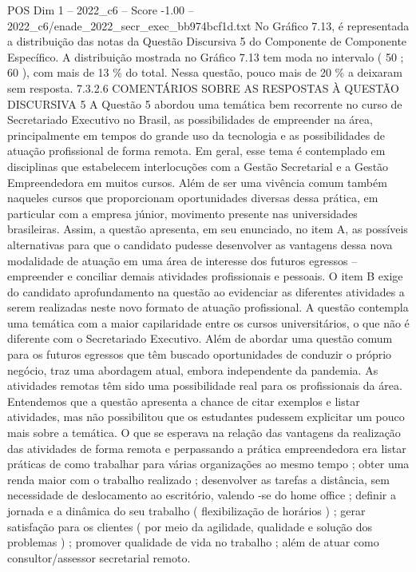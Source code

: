 \begin{textsample}{POS Dim 1 – 2022\_c6 – Score -1.00 – 2022\_c6/enade\_2022\_secr\_exec\_bb974bcf1d.txt}
No Gráfico 7.13, é representada a distribuição das notas da Questão Discursiva 5 do Componente de Componente Específico.
A distribuição mostrada no Gráfico 7.13 tem moda no intervalo ( 50 ; 60 ), com mais de 13 \% do total.
Nessa questão, pouco mais de 20 \% a deixaram sem resposta. 7.3.2.6 COMENTÁRIOS SOBRE AS RESPOSTAS À QUESTÃO DISCURSIVA 5 A Questão 5 abordou uma temática bem recorrente no curso de Secretariado Executivo no Brasil, as possibilidades de empreender na área, principalmente em tempos do grande uso da tecnologia e as possibilidades de atuação profissional de forma remota.
Em geral, esse tema é contemplado em disciplinas que estabelecem interlocuções com a Gestão Secretarial e a Gestão Empreendedora em muitos cursos.
Além de ser uma vivência comum também naqueles cursos que proporcionam oportunidades diversas dessa prática, em particular com a empresa júnior, movimento presente nas universidades brasileiras.
Assim, a questão apresenta, em seu enunciado, no item A, as possíveis alternativas para que o candidato pudesse desenvolver as vantagens dessa nova modalidade de atuação em uma área de interesse dos futuros egressos – empreender e conciliar demais atividades profissionais e pessoais.
O item B exige do candidato aprofundamento na questão ao evidenciar as diferentes atividades a serem realizadas neste novo formato de atuação profissional.
A questão contempla uma temática com a maior capilaridade entre os cursos universitários, o que não é diferente com o Secretariado Executivo.
Além de abordar uma questão comum para os futuros egressos que têm buscado oportunidades de conduzir o próprio negócio, traz uma abordagem atual, embora independente da pandemia.
As atividades remotas têm sido uma possibilidade real para os profissionais da área.
Entendemos que a questão apresenta a chance de citar exemplos e listar atividades, mas não possibilitou que os estudantes pudessem explicitar um pouco mais sobre a temática.
O que se esperava na relação das vantagens da realização das atividades de forma remota e perpassando a prática empreendedora era listar práticas de como trabalhar para várias organizações ao mesmo tempo ; obter uma renda maior com o trabalho realizado ; desenvolver as tarefas a distância, sem necessidade de deslocamento ao escritório, valendo -se do home office ; definir a jornada e a dinâmica do seu trabalho ( flexibilização de horários ) ; gerar satisfação para os clientes ( por meio da agilidade, qualidade e solução dos problemas ) ; promover qualidade de vida no trabalho ; além de atuar como consultor/assessor secretarial remoto.

\end{textsample}
